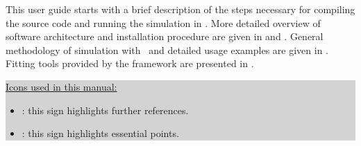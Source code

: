 This user guide starts with a brief description of the steps necessary for compiling 
the source code and running
the simulation in . More detailed overview of software architecture and
installation procedure are given in  and .
General methodology of simulation with \BornAgain\ and detailed usage examples are given
in .
Fitting tools provided by the framework are presented in .
\vspace*{2mm}

\colorbox{Lightgray}{\parbox{0.95\linewidth}
{
\noindent \underline{Icons used in this manual:}
\begin{itemize}
\item[] \smallpencil: this sign highlights further references.
\item[] {\huge\danger}: this sign highlights essential points.
\end{itemize}
}
}


